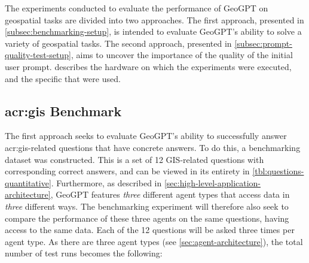 The experiments conducted to evaluate the performance of GeoGPT on geospatial tasks are divided into two approaches. The first approach, presented in \autoref{subsec:benchmarking-setup}, is intended to evaluate GeoGPT's ability to solve a variety of geospatial tasks. The second approach, presented in \autoref{subsec:prompt-quality-test-setup}, aims to uncover the importance of the quality of the initial user prompt.  describes the hardware on which the experiments were executed, and the specific  that were used.

\subsection[GIS Benchmark]{\acrshort{acr:gis} Benchmark}
\label{subsec:benchmarking-setup}


The first approach seeks to evaluate GeoGPT's ability to successfully answer \acrshort{acr:gis}-related questions that have concrete answers. To do this, a benchmarking dataset was constructed. This is a set of 12 GIS-related questions with corresponding correct answers, and can be viewed in its entirety in \autoref{tbl:questions-quantitative}. Furthermore, as described in \autoref{sec:high-level-application-architecture}, GeoGPT features \textit{three} different agent types that access data in \textit{three} different ways. The benchmarking experiment will therefore also seek to compare the performance of these three agents on the same questions, having access to the same data. Each of the 12 questions will be asked three times per agent type. As there are three agent types (see \autoref{sec:agent-architecture}), the total number of test runs becomes the following:

